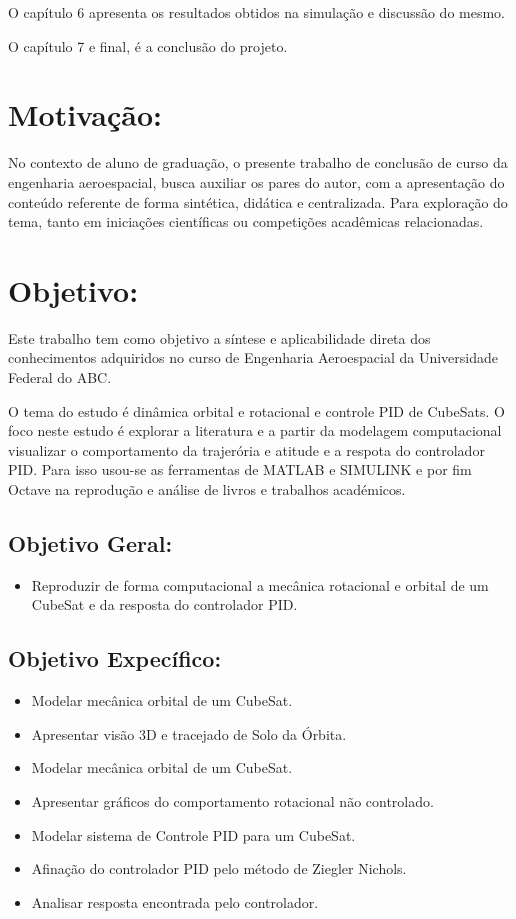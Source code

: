 O capítulo 6 apresenta os resultados obtidos na simulação e discussão do mesmo.

O capítulo 7 e final, é a conclusão do projeto.
\section*{Motivação:}\label{sec:Motivação:}
No contexto de aluno de graduação, o presente trabalho de conclusão de curso da engenharia aeroespacial, busca auxiliar os pares do autor, com a apresentação do conteúdo referente de forma sintética, didática e centralizada. Para exploração do tema, tanto em iniciações científicas ou competições acadêmicas relacionadas.
\section*{Objetivo:}\label{sec:Objetivo:}
Este trabalho tem como objetivo a síntese e aplicabilidade direta dos conhecimentos adquiridos no curso de Engenharia Aeroespacial da Universidade Federal do ABC.

O tema do estudo é dinâmica orbital e rotacional e controle PID de CubeSats. O foco neste estudo é explorar a literatura e a partir da modelagem computacional visualizar o comportamento da trajerória e atitude e a respota do controlador PID. Para isso usou-se as ferramentas de MATLAB e SIMULINK e por fim Octave na reprodução e análise de livros e trabalhos académicos.
\subsection*{Objetivo Geral:}
\begin{itemize}
\item  Reproduzir de forma computacional a mecânica rotacional e orbital de um CubeSat e da resposta do controlador PID. 
\end{itemize}

\subsection*{Objetivo Expecífico:}
\begin{itemize}
\item Modelar mecânica orbital de um CubeSat.
\item Apresentar visão 3D e tracejado de Solo da Órbita.
\item Modelar mecânica orbital de um CubeSat.
\item Apresentar gráficos do comportamento rotacional não controlado.
\item Modelar sistema de Controle PID para um CubeSat.
\item Afinação do controlador PID pelo método de Ziegler Nichols.
\item Analisar resposta encontrada pelo controlador.
\end{itemize}

